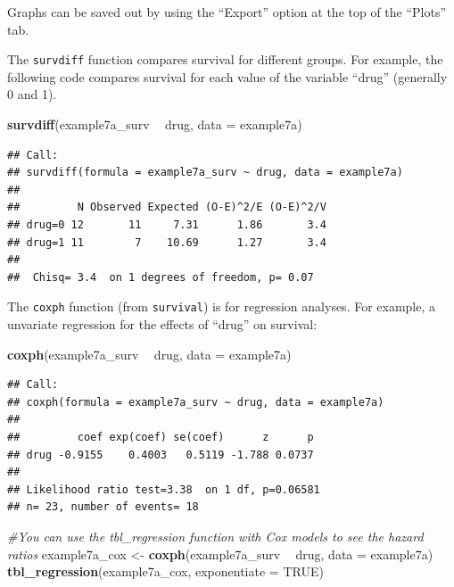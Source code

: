 \documentclass[]{book}
\newenvironment{Shaded}{\begin{snugshade}}{\end{snugshade}}
\newcommand{\CommentTok}[1]{\textcolor[rgb]{0.56,0.35,0.01}{\textit{#1}}}
\newcommand{\DataTypeTok}[1]{\textcolor[rgb]{0.13,0.29,0.53}{#1}}
\newcommand{\KeywordTok}[1]{\textcolor[rgb]{0.13,0.29,0.53}{\textbf{#1}}}
\newcommand{\NormalTok}[1]{#1}
\newcommand{\OperatorTok}[1]{\textcolor[rgb]{0.81,0.36,0.00}{\textbf{#1}}}
\newcommand{\OtherTok}[1]{\textcolor[rgb]{0.56,0.35,0.01}{#1}}
\newcommand{\StringTok}[1]{\textcolor[rgb]{0.31,0.60,0.02}{#1}}
\begin{document}
Graphs can be saved out by using the ``Export'' option at the top of the ``Plots'' tab.

The \texttt{survdiff} function compares survival for different groups. For example, the following code compares survival for each value of the variable ``drug'' (generally 0 and 1).

\begin{Shaded}
\begin{Highlighting}[]
\KeywordTok{survdiff}\NormalTok{(example7a_surv }\OperatorTok{~}\StringTok{ }\NormalTok{drug, }\DataTypeTok{data =}\NormalTok{ example7a)}
\end{Highlighting}
\end{Shaded}

\begin{verbatim}
## Call:
## survdiff(formula = example7a_surv ~ drug, data = example7a)
## 
##         N Observed Expected (O-E)^2/E (O-E)^2/V
## drug=0 12       11     7.31      1.86       3.4
## drug=1 11        7    10.69      1.27       3.4
## 
##  Chisq= 3.4  on 1 degrees of freedom, p= 0.07
\end{verbatim}

The \texttt{coxph} function (from \texttt{survival}) is for regression analyses. For example, a unvariate regression for the effects of ``drug'' on survival:

\begin{Shaded}
\begin{Highlighting}[]
\KeywordTok{coxph}\NormalTok{(example7a_surv }\OperatorTok{~}\StringTok{ }\NormalTok{drug, }\DataTypeTok{data =}\NormalTok{ example7a)}
\end{Highlighting}
\end{Shaded}

\begin{verbatim}
## Call:
## coxph(formula = example7a_surv ~ drug, data = example7a)
## 
##         coef exp(coef) se(coef)      z      p
## drug -0.9155    0.4003   0.5119 -1.788 0.0737
## 
## Likelihood ratio test=3.38  on 1 df, p=0.06581
## n= 23, number of events= 18
\end{verbatim}

\begin{Shaded}
\begin{Highlighting}[]
\CommentTok{#You can use the tbl_regression function with Cox models to see the hazard ratios}
\NormalTok{example7a_cox <-}\StringTok{ }\KeywordTok{coxph}\NormalTok{(example7a_surv }\OperatorTok{~}\StringTok{ }\NormalTok{drug, }\DataTypeTok{data =}\NormalTok{ example7a)}
\KeywordTok{tbl_regression}\NormalTok{(example7a_cox, }\DataTypeTok{exponentiate =} \OtherTok{TRUE}\NormalTok{)}
\end{Highlighting}
\end{Shaded}
\end{document}
